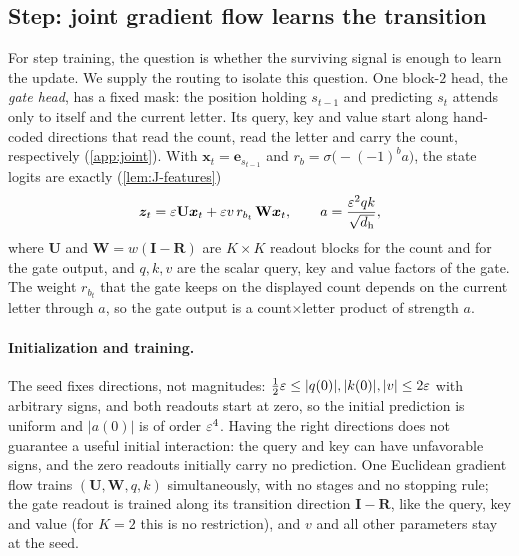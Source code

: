 \subsection{Step: joint gradient flow learns the transition}
\label{sec:step}
For step training, the question is whether the surviving signal is enough to learn the update. We supply the routing to isolate this
question. One block-$2$ head, the \emph{gate head}, has a fixed mask: the position holding $s_{t-1}$ and predicting $s_t$ attends only to
itself and the current letter. Its query, key and value start along hand-coded directions that read the count, read the letter and carry
the count, respectively (\cref{app:joint}). With $\bm x_t=\bm e_{s_{t-1}}$ and $r_b=\sigma\bigl(-(-1)^ba\bigr)$, the state logits are exactly (\cref{lem:J-features})
\[
 \bm z_t=\varepsilon \mathbf U\bm x_t+\varepsilon v\,r_{b_t}\,\mathbf W\bm x_t,
 \qquad a=\frac{\varepsilon^2qk}{\sqrt{d_{\mathrm h}}},
\]
where $\mathbf U$ and $\mathbf W=w(\mathbf I-\mathbf R)$ are $K\times K$ readout blocks for the count and for the gate output, and $q,k,v$ are the scalar query, key and
value factors of the gate. The weight $r_{b_t}$ that the gate keeps on the displayed count depends on the current letter through
$a$, so the gate output is a count$\times$letter product of strength $a$.

\paragraph{Initialization and training.} The seed fixes directions, not magnitudes: $\tfrac{1}{2}\initscale\le|q(0)|,|k(0)|,|v|\le2\initscale$ with arbitrary
signs, and both readouts start at zero, so the initial prediction is
uniform and $|a(0)|$ is of order $\varepsilon^4$. Having the right directions does not guarantee a useful initial interaction: the query
and key can have unfavorable signs, and the zero readouts initially carry no prediction. One Euclidean gradient flow trains $(\mathbf U,\mathbf W,q,k)$ simultaneously, with no stages and no
stopping rule; the gate readout is trained along its transition direction $\mathbf I-\mathbf R$, like the query, key and value (for $K=2$ this is
no restriction), and $v$ and all other parameters stay at the seed.

